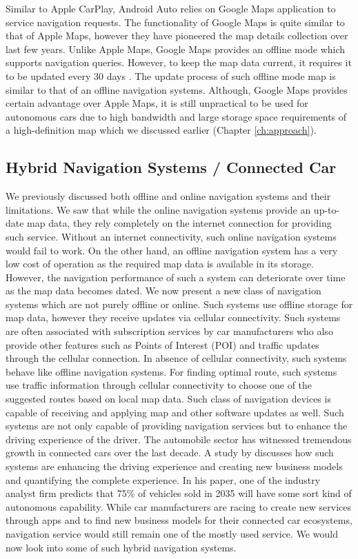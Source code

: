 Similar to Apple CarPlay, Android Auto relies on Google Maps \cite{googlemaps} application to service navigation requests. The functionality of Google Maps is quite similar to that of Apple Maps, however they have pioneered the map details collection over last few years. Unlike Apple Maps, Google Maps provides an offline mode which supports navigation queries. However, to keep the map data current, it requires it to be updated every 30 days \cite{maps30expire}. The update process of such offline mode map is similar to that of an offline navigation systems. Although, Google Maps provides certain advantage over Apple Maps, it is still unpractical to be used for autonomous cars due to high bandwidth and large storage space requirements of a high-definition map which we discussed earlier (Chapter \ref{ch:approach}). 

\subsection{Hybrid Navigation Systems / Connected Car}
We previously discussed both offline and online navigation systems and their limitations. We saw that while the online navigation systems provide an up-to-date map data, they rely completely on the internet connection for providing such service. Without an internet connectivity, such online navigation systems would fail to work. On the other hand, an offline navigation system has a very low cost of operation as the required map data is available in its storage. However, the navigation performance of such a system can deteriorate over time as the map data becomes dated. We now present a new class of navigation systems which are not purely offline or online. Such systems use offline storage for map data, however they receive updates via cellular connectivity. Such systems are often associated with subscription services by car manufacturers who also provide other features such as Points of Interest (POI) and traffic updates through the cellular connection. In absence of cellular connectivity, such systems behave like offline navigation systems. For finding optimal route, such systems use traffic information through cellular connectivity to choose one of the suggested routes based on local map data. Such class of navigation devices is capable of receiving and applying map and other software updates as well. Such systems are not only capable of providing navigation services but to enhance the driving experience of the driver. The automobile sector has witnessed tremendous growth in connected cars over the last decade. A study by \citet{swan2015connected} discusses how such systems are enhancing the driving experience and creating new business models and quantifying the complete experience. In his paper, one of the industry analyst firm predicts that 75\% of vehicles sold in 2035 will have some sort kind of autonomous capability. While car manufacturers are racing to create new services through apps and to find new business models for their connected car ecosystems, navigation service would still remain one of the mostly used service. We would now look into some of such hybrid navigation systems.
 
